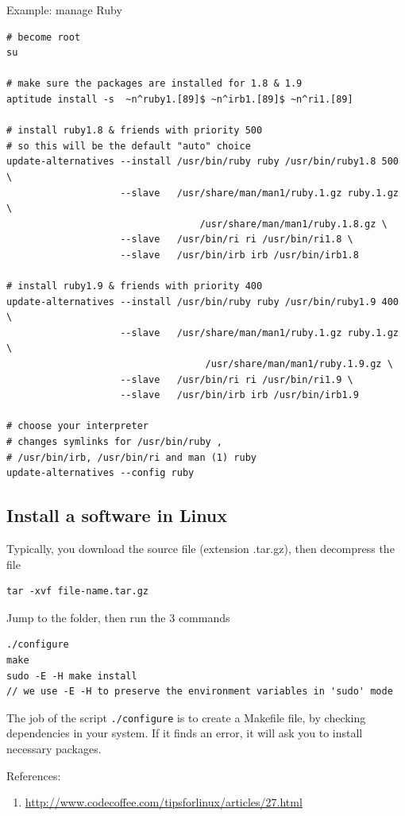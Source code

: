 Example: manage Ruby
{\small 
\begin{verbatim}
# become root
su

# make sure the packages are installed for 1.8 & 1.9
aptitude install -s  ~n^ruby1.[89]$ ~n^irb1.[89]$ ~n^ri1.[89]

# install ruby1.8 & friends with priority 500
# so this will be the default "auto" choice
update-alternatives --install /usr/bin/ruby ruby /usr/bin/ruby1.8 500 \
                    --slave   /usr/share/man/man1/ruby.1.gz ruby.1.gz \
                                  /usr/share/man/man1/ruby.1.8.gz \
                    --slave   /usr/bin/ri ri /usr/bin/ri1.8 \
                    --slave   /usr/bin/irb irb /usr/bin/irb1.8

# install ruby1.9 & friends with priority 400
update-alternatives --install /usr/bin/ruby ruby /usr/bin/ruby1.9 400 \
                    --slave   /usr/share/man/man1/ruby.1.gz ruby.1.gz \
                                   /usr/share/man/man1/ruby.1.9.gz \
                    --slave   /usr/bin/ri ri /usr/bin/ri1.9 \
                    --slave   /usr/bin/irb irb /usr/bin/irb1.9

# choose your interpreter
# changes symlinks for /usr/bin/ruby ,
# /usr/bin/irb, /usr/bin/ri and man (1) ruby
update-alternatives --config ruby 
\end{verbatim}
}


\subsection{Install a software in Linux}

Typically, you download the source file (extension .tar.gz), then decompress the
file
\begin{verbatim}
tar -xvf file-name.tar.gz
\end{verbatim}
Jump to the folder, then run the 3 commands
\begin{verbatim}
./configure
make 
sudo -E -H make install
// we use -E -H to preserve the environment variables in 'sudo' mode
\end{verbatim}

The job of the script \verb!./configure! is to create a Makefile file, by
checking dependencies in your system. If it finds an error, it will ask you to
install necessary packages. 

References:
\begin{enumerate}
  \item \url{http://www.codecoffee.com/tipsforlinux/articles/27.html}
\end{enumerate}


